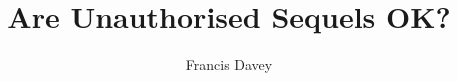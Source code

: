\documentclass{beamer}
\title{Are Unauthorised Sequels OK?}
\author{Francis Davey}
\begin{document}
\begin{frame}
  \titlepage
\end{frame}
\end{document}
